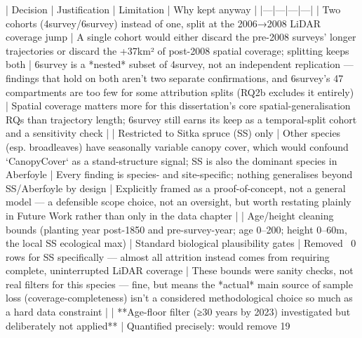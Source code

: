 | Decision | Justification | Limitation | Why kept anyway |
|---|---|---|---|
| Two cohorts (4survey/6survey) instead of one, split at the 2006→2008 LiDAR coverage jump | A single cohort would either discard the pre-2008 surveys' longer trajectories or discard the +37km² of post-2008 spatial coverage; splitting keeps both | 6survey is a *nested* subset of 4survey, not an independent replication — findings that hold on both aren't two separate confirmations, and 6survey's 47 compartments are too few for some attribution splits (RQ2b excludes it entirely) | Spatial coverage matters more for this dissertation's core spatial-generalisation RQs than trajectory length; 6survey still earns its keep as a temporal-split cohort and a sensitivity check |
| Restricted to Sitka spruce (SS) only | Other species (esp. broadleaves) have seasonally variable canopy cover, which would confound `CanopyCover` as a stand-structure signal; SS is also the dominant species in Aberfoyle | Every finding is species- and site-specific; nothing generalises beyond SS/Aberfoyle by design | Explicitly framed as a proof-of-concept, not a general model — a defensible scope choice, not an oversight, but worth restating plainly in Future Work rather than only in the data chapter |
| Age/height cleaning bounds (planting year post-1850 and pre-survey-year; age 0–200; height 0–60m, the local SS ecological max) | Standard biological plausibility gates | Removed ~0 rows for SS specifically — almost all attrition instead comes from requiring complete, uninterrupted LiDAR coverage | These bounds were sanity checks, not real filters for this species — fine, but means the *actual* main source of sample loss (coverage-completeness) isn't a considered methodological choice so much as a hard data constraint |
| **Age-floor filter (≥30 years by 2023) investigated but deliberately not applied** | Quantified precisely: would remove 19%
